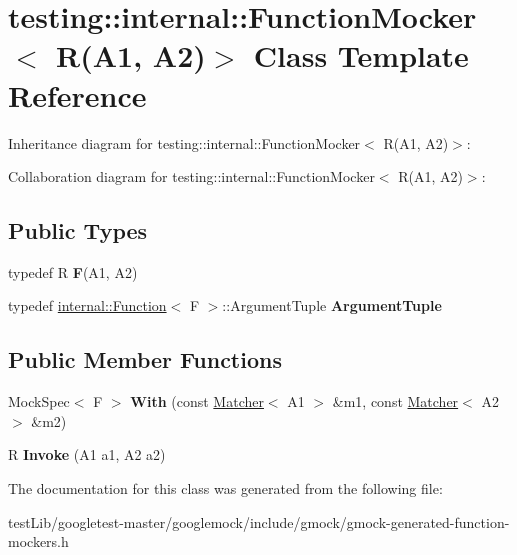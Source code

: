 \hypertarget{classtesting_1_1internal_1_1FunctionMocker_3_01R_07A1_00_01A2_08_4}{}\section{testing\+:\+:internal\+:\+:Function\+Mocker$<$ R(A1, A2)$>$ Class Template Reference}
\label{classtesting_1_1internal_1_1FunctionMocker_3_01R_07A1_00_01A2_08_4}


Inheritance diagram for testing\+:\+:internal\+:\+:Function\+Mocker$<$ R(A1, A2)$>$\+:


Collaboration diagram for testing\+:\+:internal\+:\+:Function\+Mocker$<$ R(A1, A2)$>$\+:
\subsection*{Public Types}
\begin{DoxyCompactItemize}
\item 
\mbox{\label{classtesting_1_1internal_1_1FunctionMocker_3_01R_07A1_00_01A2_08_4_a61302610bfc9b30588ea345e468310b2}} 
typedef R {\bfseries F}(A1, A2)
\item 
\mbox{\label{classtesting_1_1internal_1_1FunctionMocker_3_01R_07A1_00_01A2_08_4_ae75e3ba40a99224f7363681914212c19}} 
typedef \hyperlink{structtesting_1_1internal_1_1Function}{internal\+::\+Function}$<$ F $>$\+::Argument\+Tuple {\bfseries Argument\+Tuple}
\end{DoxyCompactItemize}
\subsection*{Public Member Functions}
\begin{DoxyCompactItemize}
\item 
\mbox{\label{classtesting_1_1internal_1_1FunctionMocker_3_01R_07A1_00_01A2_08_4_a719a26a1389c51c175909d34175a9f0e}} 
Mock\+Spec$<$ F $>$ {\bfseries With} (const \hyperlink{classtesting_1_1Matcher}{Matcher}$<$ A1 $>$ \&m1, const \hyperlink{classtesting_1_1Matcher}{Matcher}$<$ A2 $>$ \&m2)
\item 
\mbox{\label{classtesting_1_1internal_1_1FunctionMocker_3_01R_07A1_00_01A2_08_4_a518f5ac78887c64580343554aaae8f44}} 
R {\bfseries Invoke} (A1 a1, A2 a2)
\end{DoxyCompactItemize}


The documentation for this class was generated from the following file\+:\begin{DoxyCompactItemize}
\item 
test\+Lib/googletest-\/master/googlemock/include/gmock/gmock-\/generated-\/function-\/mockers.\+h\end{DoxyCompactItemize}
